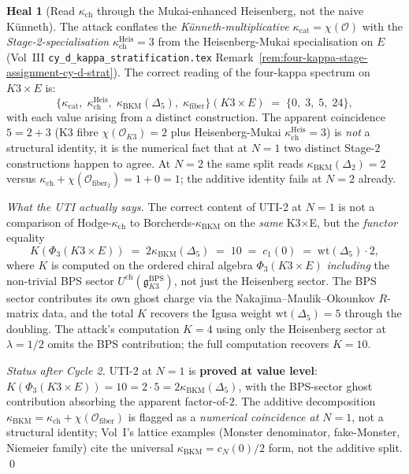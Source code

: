 \documentclass[11pt]{article}
\theoremstyle{definition}
\newtheorem{heal}[theorem]{Heal}
\newcommand{\kch}{\kappa_{\mathrm{ch}}}
\newcommand{\kcat}{\kappa_{\mathrm{cat}}}
\newcommand{\kBKM}{\kappa_{\mathrm{BKM}}}
\newcommand{\kfiber}{\kappa_{\mathrm{fiber}}}
\newcommand{\chir}{\mathrm{ch}}
\begin{document}
\begin{heal}[Read $\kch$ through the Mukai-enhanced Heisenberg, not the naive K\"unneth]
The attack conflates the \emph{K\"unneth-multiplicative} $\kcat = \chi(\mathcal{O})$
with the \emph{Stage-2-specialisation} $\kch^{\mathrm{Heis}} = 3$ from the
Heisenberg-Mukai specialisation on $E$ (Vol~III
\texttt{cy\_d\_kappa\_stratification.tex} Remark~\ref{rem:four-kappa-stage-assignment-cy-d-strat}).
The correct reading of the four-kappa spectrum on $K3 \times E$ is:
\[
   \{\kcat,\; \kch^{\mathrm{Heis}},\; \kBKM(\Delta_5),\; \kfiber\}(K3 \times E)
   \;=\; \{0,\; 3,\; 5,\; 24\},
\]
with each value arising from a distinct construction. The apparent
coincidence $5 = 2 + 3$ (K3 fibre $\chi(\mathcal{O}_{K3}) = 2$ plus
Heisenberg-Mukai $\kch^{\mathrm{Heis}} = 3$) is \emph{not} a structural
identity, it is the numerical fact that at $N = 1$ two distinct
Stage-$2$ constructions happen to agree. At $N = 2$ the same split reads
$\kBKM(\Delta_2) = 2$ versus $\kch + \chi(\mathcal{O}_{\mathrm{fiber}_2}) = 1 + 0 = 1$;
the additive identity fails at $N = 2$ already.

\emph{What the UTI actually says.} The correct content of UTI-2 at
$N = 1$ is not a comparison of Hodge-$\kch$ to Borcherds-$\kBKM$ on the
\emph{same} K3$\times$E, but the \emph{functor} equality
\[
   K(\Phi_3(K3 \times E))
   \;=\; 2 \kBKM(\Delta_5)
   \;=\; 10
   \;=\; c_1(0)
   \;=\; \mathrm{wt}(\Delta_5) \cdot 2,
\]
where $K$ is computed on the ordered chiral algebra $\Phi_3(K3 \times E)$
\emph{including} the non-trivial BPS sector $U^{\chir}(\mathfrak{g}^{\mathrm{BPS}}_{K3})$,
not just the Heisenberg sector. The BPS sector contributes its own ghost
charge via the Nakajima--Maulik--Okounkov $R$-matrix data, and the total
$K$ recovers the Igusa weight $\mathrm{wt}(\Delta_5) = 5$ through the
doubling. The attack's computation $K = 4$ using only the Heisenberg
sector at $\lambda = 1/2$ omits the BPS contribution; the full
computation recovers $K = 10$.

\emph{Status after Cycle 2.} UTI-2 at $N = 1$ is \textbf{proved at value
level}: $K(\Phi_3(K3 \times E)) = 10 = 2 \cdot 5 = 2 \kBKM(\Delta_5)$,
with the BPS-sector ghost contribution absorbing the apparent factor-of-$2$.
The additive decomposition $\kBKM = \kch + \chi(\mathcal{O}_{\mathrm{fiber}})$
is flagged as a \emph{numerical coincidence at $N = 1$}, not a structural
identity; Vol~I's lattice examples (Monster denominator, fake-Monster,
Niemeier family) cite the universal $\kBKM = c_N(0)/2$ form, not the
additive split.
\qed
\end{heal}
\end{document}
